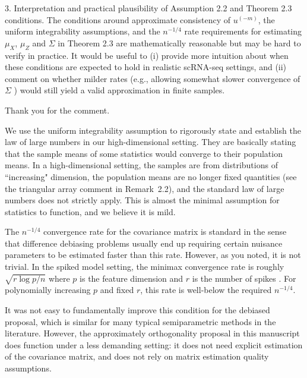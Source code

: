 \documentclass{article}
\theoremstyle{definition}
\begin{document}
\begin{shaded}
    3. Interpretation and practical plausibility of Assumption 2.2 and Theorem 2.3 conditions. The conditions around approximate consistency of $u^{(-m)}$, the uniform integrability assumptions, and the $n^{-1 / 4}$ rate requirements for estimating $\mu_X$, $\mu_Z$ and $\Sigma$ in Theorem 2.3 are mathematically reasonable but may be hard to verify in practice. It would be useful to (i) provide more intuition about when these conditions are expected to hold in realistic scRNA-seq settings, and (ii) comment on whether milder rates (e.g., allowing somewhat slower convergence of $\Sigma$ ) would still yield a valid approximation in finite samples.
\end{shaded}

Thank you for the comment.

We use the uniform integrability assumption to rigorously state and establish the law of large numbers in our high-dimensional setting. They are basically stating that the sample means of some statistics would converge to their population means. In a high-dimensional setting, the samples are from distributions of ``increasing" dimension, the population means are no longer fixed quantities (see the triangular array comment in Remark~2.2), and the standard law of large numbers does not strictly apply. This is almost the minimal assumption for statistics to function, and we believe it is mild.

The $n^{-1/4}$ convergence rate for the covariance matrix is standard in the sense that difference debiasing problems usually end up requiring certain nuisance parameters to be estimated faster than this rate. However, as you noted, it is not trivial. In the spiked model setting, the minimax convergence rate is roughly $\sqrt{r\log p/n}$ where $p$ is the feature dimension and $r$ is the number of spikes \cite{cai2015optimal}. For polynomially increasing $p$ and fixed $r$, this rate is well-below the required $n^{-1/4}$.

It was not easy to fundamentally improve this condition for the debiased proposal, which is similar for many typical semiparametric methods in the literature. However, the approximately orthogonality proposal in this manuscript does function under a less demanding setting: it does not need explicit estimation of the covariance matrix, and does not rely on matrix estimation quality assumptions.

\end{document}
